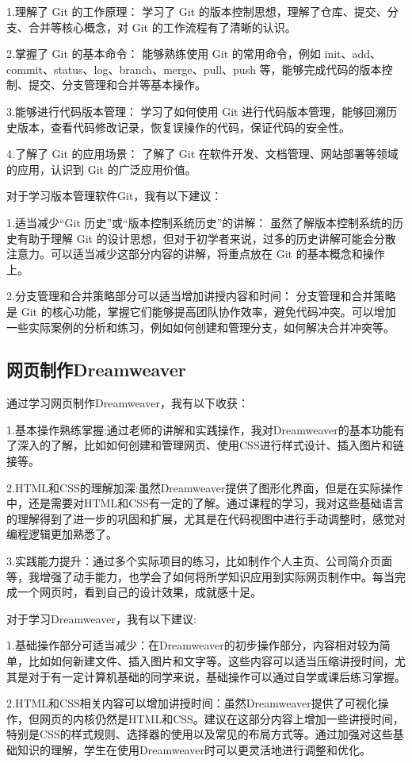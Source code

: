 \documentclass[supercite]{Experimental_Report}
\theoremstyle{definition}
\begin{document}
\par 1.理解了 Git 的工作原理： 学习了 Git 的版本控制思想，理解了仓库、提交、分支、合并等核心概念，对 Git 的工作流程有了清晰的认识。
\par 2.掌握了 Git 的基本命令： 能够熟练使用 Git 的常用命令，例如 init、add、commit、status、log、branch、merge、pull、push 等，能够完成代码的版本控制、提交、分支管理和合并等基本操作。
\par 3.能够进行代码版本管理： 学习了如何使用 Git 进行代码版本管理，能够回溯历史版本，查看代码修改记录，恢复误操作的代码，保证代码的安全性。
\par 4.了解了 Git 的应用场景： 了解了 Git 在软件开发、文档管理、网站部署等领域的应用，认识到 Git 的广泛应用价值。
\par 对于学习版本管理软件Git，我有以下建议：
\par 1.适当减少“Git 历史”或“版本控制系统历史”的讲解： 虽然了解版本控制系统的历史有助于理解 Git 的设计思想，但对于初学者来说，过多的历史讲解可能会分散注意力。可以适当减少这部分内容的讲解，将重点放在 Git 的基本概念和操作上。
\par 2.分支管理和合并策略部分可以适当增加讲授内容和时间： 分支管理和合并策略是 Git 的核心功能，掌握它们能够提高团队协作效率，避免代码冲突。可以增加一些实际案例的分析和练习，例如如何创建和管理分支，如何解决合并冲突等。

\subsection{网页制作Dreamweaver}
通过学习网页制作Dreamweaver，我有以下收获：
\par 1.基本操作熟练掌握:通过老师的讲解和实践操作，我对Dreamweaver的基本功能有了深入的了解，比如如何创建和管理网页、使用CSS进行样式设计、插入图片和链接等。
\par 2.HTML和CSS的理解加深:虽然Dreamweaver提供了图形化界面，但是在实际操作中，还是需要对HTML和CSS有一定的了解。通过课程的学习，我对这些基础语言的理解得到了进一步的巩固和扩展，尤其是在代码视图中进行手动调整时，感觉对编程逻辑更加熟悉了。
\par 3.实践能力提升：通过多个实际项目的练习，比如制作个人主页、公司简介页面等，我增强了动手能力，也学会了如何将所学知识应用到实际网页制作中。每当完成一个网页时，看到自己的设计效果，成就感十足。
\par 对于学习Dreamweaver，我有以下建议:
\par 1.基础操作部分可适当减少：在Dreamweaver的初步操作部分，内容相对较为简单，比如如何新建文件、插入图片和文字等。这些内容可以适当压缩讲授时间，尤其是对于有一定计算机基础的同学来说，基础操作可以通过自学或课后练习掌握。
\par 2.HTML和CSS相关内容可以增加讲授时间：虽然Dreamweaver提供了可视化操作，但网页的内核仍然是HTML和CSS。建议在这部分内容上增加一些讲授时间，特别是CSS的样式规则、选择器的使用以及常见的布局方式等。通过加强对这些基础知识的理解，学生在使用Dreamweaver时可以更灵活地进行调整和优化。

\nocite{*} %
%
%
\end{document}
